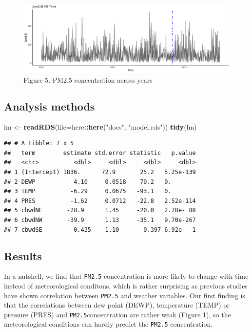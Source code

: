 \documentclass[
]{article}
\newenvironment{Shaded}{\begin{snugshade}}{\end{snugshade}}
\newcommand{\DataTypeTok}[1]{\textcolor[rgb]{0.13,0.29,0.53}{#1}}
\newcommand{\KeywordTok}[1]{\textcolor[rgb]{0.13,0.29,0.53}{\textbf{#1}}}
\newcommand{\NormalTok}[1]{#1}
\newcommand{\OperatorTok}[1]{\textcolor[rgb]{0.81,0.36,0.00}{\textbf{#1}}}
\newcommand{\StringTok}[1]{\textcolor[rgb]{0.31,0.60,0.02}{#1}}
\begin{document}
\begin{figure}
\centering
\includegraphics{../images/year_PM2.5.png}
\caption{Figure 5. PM2.5 concentration across years}
\end{figure}

\hypertarget{analysis-methods}{%
\subsection{Analysis methods}\label{analysis-methods}}

\begin{Shaded}
\begin{Highlighting}[]
\NormalTok{lm <-}\StringTok{ }\KeywordTok{readRDS}\NormalTok{(}\DataTypeTok{file=}\NormalTok{here}\OperatorTok{::}\KeywordTok{here}\NormalTok{(}\StringTok{"docs"}\NormalTok{, }\StringTok{"model.rds"}\NormalTok{))}
\KeywordTok{tidy}\NormalTok{(lm)}
\end{Highlighting}
\end{Shaded}

\begin{verbatim}
## # A tibble: 7 x 5
##   term        estimate std.error statistic   p.value
##   <chr>          <dbl>     <dbl>     <dbl>     <dbl>
## 1 (Intercept) 1836.      72.9       25.2   5.25e-139
## 2 DEWP           4.10     0.0518    79.2   0.       
## 3 TEMP          -6.29     0.0675   -93.1   0.       
## 4 PRES          -1.62     0.0712   -22.8   2.52e-114
## 5 cbwdNE       -28.9      1.45     -20.0   2.78e- 88
## 6 cbwdNW       -39.9      1.13     -35.1   9.70e-267
## 7 cbwdSE         0.435    1.10       0.397 6.92e-  1
\end{verbatim}

\hypertarget{results}{%
\subsection{Results}\label{results}}

In a nutshell, we find that \texttt{PM2.5} concentration is more likely
to change with time instead of meteorological conditons, which is rather
surprising as previous studies have shown correlation between
\texttt{PM2.5} and weather variables. Our first finding is that the
correlations between dew point (DEWP), temperature (TEMP) or pressure
(PRES) and \texttt{PM2.5}concentration are rather weak (Figure 1), so
the meteorological conditions can hardly predict the \texttt{PM2.5}
concentration.
\end{document}
